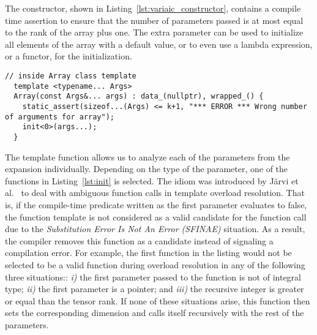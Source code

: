 \documentclass[11pt]{article}
\newcommand{\code}[1]{{\footnotesize\ttfamily{#1}}}
\begin{document}
The constructor, shown in Listing~\ref{lst:variaic_constructor}, contains a compile time assertion to ensure that the number of parameters passed is at most equal to the rank of the array plus one. The extra parameter can be used to initialize all elements of the array with a default value, or to even use a lambda expression, or a functor, for the initialization.
\begin{lstlisting}[caption={Variadic template constructor}, label=lst:variaic_constructor]
  // inside Array class template
  template <typename... Args>
  Array(const Args&... args) : data_(nullptr), wrapped_() {    
    static_assert(sizeof...(Args) <= k+1, "*** ERROR *** Wrong number of arguments for array");
    init<0>(args...);
  }
\end{lstlisting}
The template function \code{init} allows us to analyze each of the parameters from the expansion individually. Depending on the type of the parameter, one of the functions in Listing~\ref{lst:init} is selected.
The \code{enable\_if} idiom was introduced by J\"arvi et al.~\cite{Jarvi:2003} to deal with ambiguous function calls in template overload resolution. That is, if the compile-time predicate written as the first parameter evaluates to false, the function template is not considered as a valid candidate for the function call due to the \emph{Substitution Error Is Not An Error (SFINAE)} situation. As a result, the compiler removes this function as a candidate instead of signaling a compilation error.
For example, the first function \code{init} in the listing would not be selected to be a valid function during overload resolution in any of the following three situations:: \emph{i)} the first parameter passed to the function is not of integral type; \emph{ii)} the first parameter is a pointer; and \emph{iii)} the recursive integer \code{d} is greater or equal than the tensor rank.
If none of these situations arise, this function then sets the corresponding dimension and calls itself recursively with the rest of the parameters.
\end{document}
